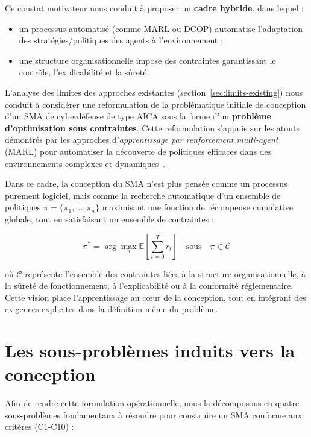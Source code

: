 \documentclass[ twoside,openright,titlepage,numbers=noenddot,headinclude,%
                footinclude=true,cleardoublepage=empty,abstractoff, %
                BCOR=5mm,paper=a4,fontsize=11pt,%
                french,american,%
                ]{scrreprt}
\begin{document}
Ce constat motivateur nous conduit à proposer un \textbf{cadre hybride}, dans lequel :
\begin{itemize}
    \item un processus automatisé (comme MARL ou DCOP) automatise l'adaptation des stratégies/politiques des agents à l'environnement ;
    \item une structure organisationnelle impose des contraintes garantissant le contrôle, l'explicabilité et la sûreté.
\end{itemize}

L'analyse des limites des approches existantes (section~\ref{sec:limits-existing}) nous conduit à considérer une reformulation de la problématique initiale de conception d'un SMA de cyberdéfense de type AICA sous la forme d'un \textbf{problème d'optimisation sous contraintes}. Cette reformulation s'appuie sur les atouts démontrés par les approches d'\textit{apprentissage par renforcement multi-agent} (MARL) pour automatiser la découverte de politiques efficaces dans des environnements complexes et dynamiques~\cite{Zhang2021survey, Papoudakis2021}.

Dans ce cadre, la conception du SMA n'est plus pensée comme un processus purement logiciel, mais comme la recherche automatique d'un ensemble de politiques \(\pi = \{\pi_1, \dots, \pi_n\}\) maximisant une fonction de récompense cumulative globale, tout en satisfaisant un ensemble de contraintes :

\begin{equation}
    \pi^* = \arg\max_{\pi} \mathbb{E}\left[\sum_{t=0}^{T} r_t\right] \quad \text{sous} \quad \pi \in \mathcal{C}
\end{equation}

où \(\mathcal{C}\) représente l'ensemble des contraintes liées à la structure organisationnelle, à la sûreté de fonctionnement, à l'explicabilité ou à la conformité réglementaire. Cette vision place l'apprentissage au cœur de la conception, tout en intégrant des exigences explicites dans la définition même du problème.

\section{Les sous-problèmes induits vers la conception}

Afin de rendre cette formulation opérationnelle, nous la décomposons en quatre sous-problèmes fondamentaux à résoudre pour construire un SMA conforme aux critères (C1-C10) :
\end{document}
